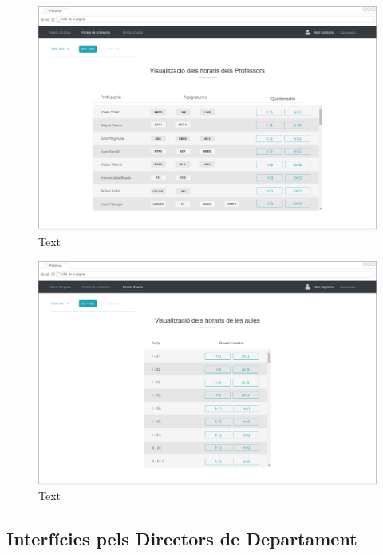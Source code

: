 \documentclass[a4paper,12pt]{ThesisStyle}
\begin{document}
\begin{figure}[H]
	\centering
	\includegraphics[width=\textwidth]{assets/interfaces/coordinadors/horarisProfessors/main.pdf}
	\caption{\label{img:horarisProfessors_main}Text}
\end{figure}

\begin{figure}[H]
	\centering
	\includegraphics[width=\textwidth]{assets/interfaces/coordinadors/horarisAules/main.pdf}
	\caption{\label{img:horarisAules_main}Text}
\end{figure}


\subsection{Interfícies pels Directors de Departament}
\label{subsec:interficies_directors}
\end{document}

